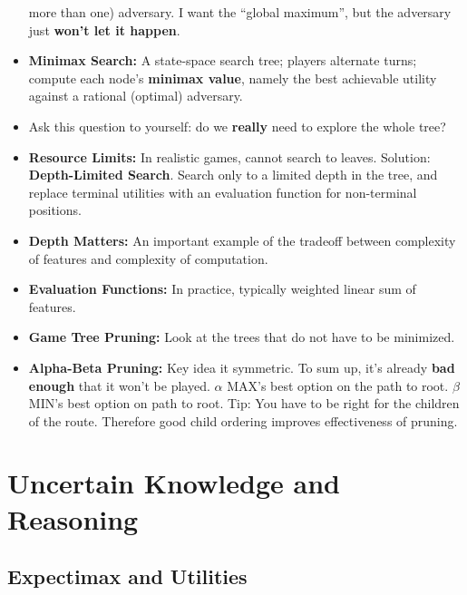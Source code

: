 \documentclass[twocolumn]{article}
\begin{document}
\begin{itemize}
  more than one) adversary. I want the ``global maximum'', but the
  adversary just \textbf{won't let it happen}.
\item \textbf{Minimax Search:} A state-space search tree; players
  alternate turns; compute each node's \textbf{minimax value}, namely
  the best achievable utility against a rational (optimal) adversary.
\item Ask this question to yourself: do we \textbf{really} need to
  explore the whole tree?
\item \textbf{Resource Limits:} In realistic games, cannot search to
  leaves. Solution: \textbf{Depth-Limited Search}. Search only to a
  limited depth in the tree, and replace terminal utilities with an
  evaluation function for non-terminal positions.
\item \textbf{Depth Matters:} An important example of the tradeoff
  between complexity of features and complexity of computation.
\item \textbf{Evaluation Functions:} In practice, typically weighted
  linear sum of features. 
\item \textbf{Game Tree Pruning:} Look at the trees that do not have
  to be minimized. 
\item \textbf{Alpha-Beta Pruning:} Key idea it symmetric. To sum up,
  it's already \textbf{bad enough} that it won't be played. $\alpha$
  MAX's best option on the path to root. $\beta$ MIN's best option on
  path to root. Tip: You have to be right for the children of the
  route. Therefore good child ordering improves effectiveness of
  pruning. 
\end{itemize}

\section{Uncertain Knowledge and Reasoning}
\label{sec:uncert-knowl-reas}



\subsection{Expectimax and Utilities}
\label{sec:expectimax-utilities}
\end{document}
